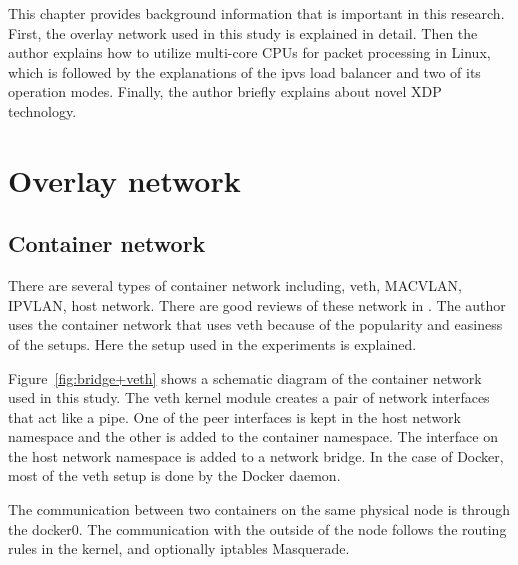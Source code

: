 
This chapter provides background information that is important in this research.
First, the overlay network used in this study is explained in detail.
Then the author explains how to utilize multi-core CPUs for packet processing in Linux,
which is followed by the explanations of the ipvs load balancer and two of its operation modes.
Finally, the author briefly explains about novel XDP technology.

\section{Overlay network}

\subsection{Container network}

There are several types of container network including, veth\cite{bhattiprolu2008virtual}, MACVLAN\cite{rathore2010performance}, IPVLAN\cite{ipvlan}, host network.
There are good reviews of these network in \cite{Marmol2015,claassen2016linux,struye2017assessing}.
The author uses the container network that uses veth because of the popularity and easiness of the setups.
Here the setup used in the experiments is explained.

Figure~\ref{fig:bridge+veth} shows a schematic diagram of the container network used in this study.
The veth kernel module creates a pair of network interfaces that act like a pipe.
One of the peer interfaces is kept in the host network namespace and the other is added to the container namespace.
The interface on the host network namespace is added to a network bridge.
In the case of Docker, most of the veth setup is done by the Docker daemon.

The communication between two containers on the same physical node is through the docker0.
The communication with the outside of the node follows the routing rules in the kernel, and optionally iptables Masquerade.  

